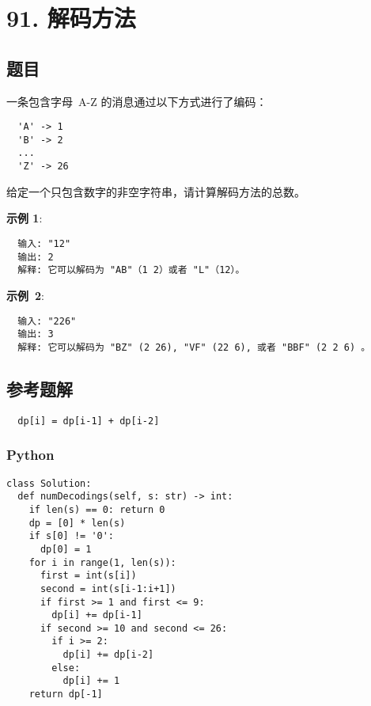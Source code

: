 \newpage
\section{91. 解码方法}
\label{leetcode:91}

\subsection{题目}

一条包含字母 A-Z 的消息通过以下方式进行了编码：

\begin{verbatim}
  'A' -> 1
  'B' -> 2
  ...
  'Z' -> 26
\end{verbatim}

给定一个只包含数字的非空字符串，请计算解码方法的总数。

\textbf{示例 1}:

\begin{verbatim}
  输入: "12"
  输出: 2
  解释: 它可以解码为 "AB"（1 2）或者 "L"（12）。
\end{verbatim}

\textbf{示例 2}:

\begin{verbatim}
  输入: "226"
  输出: 3
  解释: 它可以解码为 "BZ" (2 26), "VF" (22 6), 或者 "BBF" (2 2 6) 。
\end{verbatim}

\subsection{参考题解}

\begin{verbatim}
  dp[i] = dp[i-1] + dp[i-2]
\end{verbatim}

\subsubsection{Python}

\begin{verbatim}
class Solution:
  def numDecodings(self, s: str) -> int:
    if len(s) == 0: return 0
    dp = [0] * len(s)
    if s[0] != '0':
      dp[0] = 1
    for i in range(1, len(s)):
      first = int(s[i])
      second = int(s[i-1:i+1])
      if first >= 1 and first <= 9:
        dp[i] += dp[i-1]
      if second >= 10 and second <= 26:
        if i >= 2:
          dp[i] += dp[i-2]
        else:
          dp[i] += 1
    return dp[-1]
\end{verbatim}
